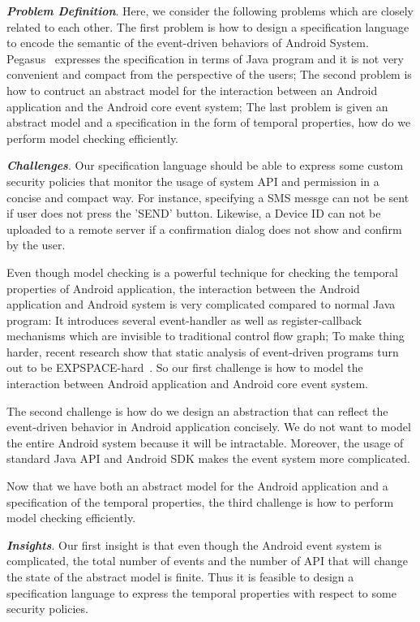 \documentclass{article}
\begin{document}
{\bf \emph{Problem Definition}}. Here, we consider the following problems
which are closely related to each other. The first problem is how to design
a specification language to encode the semantic of the event-driven behaviors 
of Android System. Pegasus~\cite{pegasus} expresses the specification 
in terms of Java program and it is not very convenient and compact from the
perspective of the users; The second problem is how to contruct an abstract
model for the interaction between an Android application and the Android
core event system; The last problem is given an abstract model and a specification
in the form of temporal properties, how do we perform model checking efficiently.

{\bf \emph{Challenges}}. Our specification language should be able to 
express some custom security policies that monitor the usage of system API and 
permission in a concise and compact way. For instance, specifying a SMS messge
can not be sent if user does not press the 'SEND' button. Likewise, 
a Device ID can not be uploaded to a remote server if a confirmation 
dialog does not show and confirm by the user.

Even though model checking is a powerful technique for checking the temporal 
properties of Android application, the interaction between the Android application
and Android system is very complicated compared to normal Java program: 
It introduces several event-handler as well as  register-callback mechanisms
which are invisible to traditional control flow graph; To make thing harder, 
recent research show that static analysis of event-driven programs turn out 
to be EXPSPACE-hard~\cite{jhala2007}. So our first challenge is how to model the
interaction between Android application and Android core event system.

The second challenge is how do we design an abstraction that can reflect the 
event-driven behavior in Android application concisely. We do not want to 
model the entire Android system because it will be intractable. Moreover,
the usage of standard Java API and Android SDK makes the event system more complicated.

Now that we have both an abstract model for the Android application and 
a specification of the temporal properties, the third challenge is how to 
perform model checking efficiently. 

{\bf \emph{Insights}}. Our first insight is that even though the Android
event system is complicated, the total number of events and the number of 
API that will change the state of the abstract model is finite. Thus it is
feasible to design a specification language to express the temporal properties
with respect to some security policies. 
\end{document}
